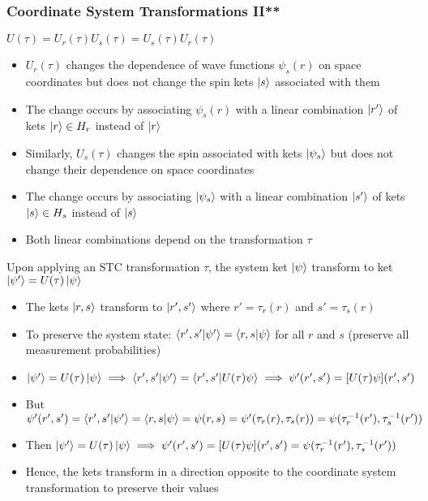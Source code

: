 \documentclass[8pt,t,mathserif,aspectratio=169]{beamer}
\begin{document}
\begin{frame}
  \frametitle{Coordinate System Transformations II**}
  \vspace{1mm}
  $U(\tau) = U_r(\tau) U_s(\tau) = U_s(\tau) U_r(\tau)$
  \begin{itemize}
    \item $U_r(\tau)$ changes the dependence of wave functions $\psi_s(r)$ on space coordinates but does not change the spin kets $\ket{s}$ associated with them
    \item The change occurs by associating $\psi_s(r)$ with a linear combination $\ket{r'}$ of kets $\ket{r} \in H_r$ instead of $\ket{r}$
    \item Similarly, $U_s(\tau)$ changes the spin associated with kets $\ket{\psi_s}$ but does not change their dependence on space coordinates
    \item The change occurs by associating $\ket{\psi_s}$ with a linear combination $\ket{s'}$ of kets $\ket{s} \in H_s$ instead of $\ket{s}$
    \item Both linear combinations depend on the transformation $\tau$
  \end{itemize}
  Upon applying an STC transformation $\tau$, the system ket $\ket{\psi}$ transform to ket $\ket{\psi'} = U(\tau) \ket{\psi}$
  \begin{itemize}
    \item The kets $\ket{r,s}$ transform to $\ket{r',s'}$ where $r' = \tau_r(r)$ and $s' = \tau_s(r)$
    \item To preserve the system state: $\braket{r',s'}{\psi'} = \braket{r,s}{\psi}$ for all $r$ and $s$ (preserve all measurement probabilities)
    \item $\ket{\psi'} = U(\tau) \ket{\psi} \implies \braket{r',s'}{\psi'} = \braket{r',s'}{U(\tau) \psi} \implies \psi'(r',s') = [U(\tau) \psi](r',s')$
    \item But $\psi'(r',s') = \braket{r',s'}{\psi'} = \braket{r,s}{\psi} = \psi(r,s) = \psi'(\tau_r(r),\tau_s(r)) = \psi(\tau^{-1}_r(r'),\tau^{-1}_s(r'))$ 
    \item Then $\ket{\psi'} = U(\tau) \ket{\psi} \implies \psi'(r',s') = [U(\tau) \psi](r',s') = \psi(\tau^{-1}_r(r'),\tau^{-1}_s(r'))$
    \item Hence, the kets transform in a direction opposite to the coordinate system transformation to preserve their values
  \end{itemize}
\end{frame}
\end{document}
